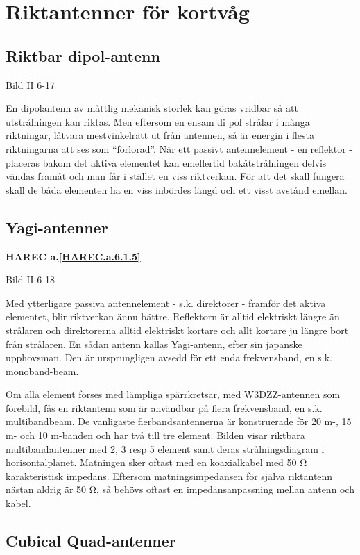 \section{Riktantenner för kortvåg}

\subsection{Riktbar dipol-antenn}

Bild II 6-17

En dipolantenn av måttlig mekanisk storlek kan göras vridbar så att
utstrålningen kan riktas. Men eftersom en ensam di pol strålar i många
riktningar, låtvara mestvinkelrätt ut från antennen, så är energin i
flesta riktningarna att ses som ``förlorad''. När ett passivt
antennelement - en reflektor - placeras bakom det aktiva elementet kan
emellertid bakåtstrålningen delvis vändas framåt och man får i stället
en viss riktverkan. För att det skall fungera skall de båda elementen
ha en viss inbördes längd och ett visst avstånd emellan.


\subsection{Yagi-antenner}
\textbf{
HAREC a.\ref{HAREC.a.6.1.5}\label{myHAREC.a.6.1.5}
}

Bild II 6-18

Med ytterligare passiva antennelement - s.k. direktorer - framför det
aktiva elementet, blir riktverkan ännu bättre. Reflektorn är alltid
elektriskt längre än strålaren och direktorerna alltid elektriskt
kortare och allt kortare ju längre bort från strålaren. En sådan
antenn kallas Yagi-antenn, efter sin japanske upphovsman. Den är
ursprungligen avsedd för ett enda frekvensband, en s.k. monoband-beam.

Om alla element förses med lämpliga spärrkretsar, med W3DZZ-antennen
som förebild, fås en riktantenn som är användbar på flera
frekvensband, en s.k. multibandbeam. De vanligaste flerbandsantennerna
är konstruerade för 20 m-, 15 m- och 10 m-banden och har två till tre
element.  Bilden visar riktbara multibandantenner med 2, 3 resp 5
element samt deras strålningsdiagram i horisontalplanet.  Matningen
sker oftast med en koaxialkabel med 50 Ω karakteristisk
impedans. Eftersom matningsimpedansen för själva riktantenn nästan
aldrig är 50 Ω, så behövs oftast en impedansanpassning mellan antenn
och kabel.

\subsection{Cubical Quad-antenner}

